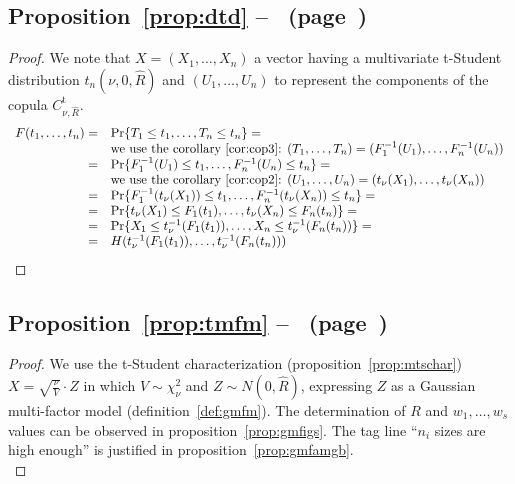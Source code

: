 \documentclass[11pt,fleqn]{book} %
\begin{document}
\subsection{Proposition~\ref{prop:dtd} --~ (page~\pageref{prop:dtd})}
\begin{proof}
	We note that $X=(X_1,\dots,X_n)$ a vector having a multivariate t-Student
	distribution $t_n(\nu,0,\widehat{R})$ and $(U_1,\dots,U_n)$ to represent
	the components of the copula $C_{\nu,\widehat{R}}^{\text{t}}$.
	\begin{displaymath}
		\begin{array}{rl}
			F(t_1,\dots,t_n) = & \Pr\{ T_1 \le t_1 , \dots, T_n \le t_n \} = \\
			                   & \text{we use the corollary~\ref{cor:cop3}: }
			(T_1,\dots,T_n) = (F_1^{-1}(U_1),\dots,F_n^{-1}(U_n)) \\
			=                  & \Pr\{ F_1^{-1}(U_1) \le t_1 , \dots , F_n^{-1}(U_n) \le t_n \} = \\
			                   & \text{we use the corollary~\ref{cor:cop2}: }
			(U_1,\dots,U_n) = (t_\nu(X_1),\dots,t_\nu(X_n)) \\
			=                  & \Pr\{ F_1^{-1}(t_\nu(X_1)) \le t_1 , \dots , F_n^{-1}(t_\nu(X_n)) \le t_n \} = \\
			=                  & \Pr\{ t_\nu(X_1) \le F_1(t_1), \dots , t_\nu(X_n) \le F_n(t_n) \} = \\
			=                  & \Pr\{ X_1 \le t_\nu^{-1}(F_1(t_1)), \dots , X_n \le t_\nu^{-1}(F_n(t_n)) \} = \\
			=                  & H(t_\nu^{-1}(F_1(t_1)), \dots, t_\nu^{-1}(F_n(t_n))) \\
		\end{array}
	\end{displaymath}
\end{proof}

\subsection{Proposition~\ref{prop:tmfm} --~ (page~\pageref{prop:tmfm})}
\begin{proof}
	We use the t-Student characterization (proposition~\ref{prop:mtschar})
	$X = \sqrt{\frac{\nu}{V}} \cdot Z$ in which $V \sim \chi_{\nu}^2$ and 
	$Z \sim N(0,\widehat{R})$, expressing $Z$ as a Gaussian multi-factor model 
	(definition~\ref{def:gmfm}). The determination of $R$ and $w_1,\dots,w_s$
	values can be observed in proposition~\ref{prop:gmfigs}. The tag line 
	``$n_i$ sizes are high enough'' is justified in 
	proposition~\ref{prop:gmfamgb}.
	\\
\end{proof}
\end{document}

